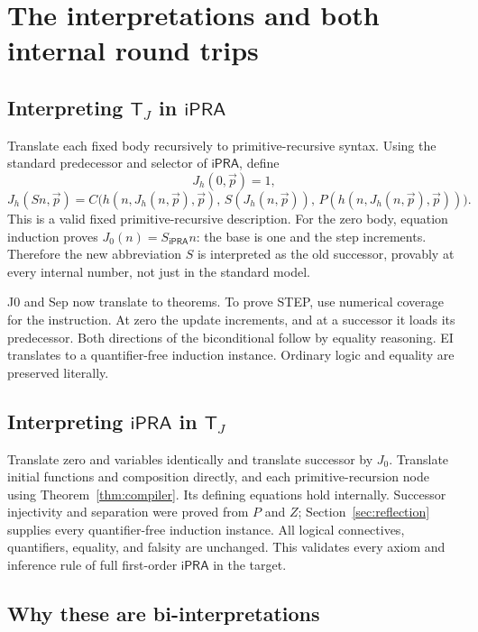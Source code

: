 \documentclass[11pt,letterpaper]{article}
\theoremstyle{definition}\newtheorem{definition}[theorem]{Definition}
\theoremstyle{remark}\newtheorem{remark}[theorem]{Remark}
\newcommand{\ipra}{\mathsf{iPRA}}
\newcommand{\TJ}{\mathsf T_J}
\begin{document}
\section{The interpretations and both internal round trips}\label{sec:interpretations}

\subsection{Interpreting \texorpdfstring{$\TJ$}{T-J} in \texorpdfstring{$\ipra$}{iPRA}}

Translate each fixed body recursively to primitive-recursive syntax.
Using the standard predecessor and selector of $\ipra$, define
\[
 J_h(0,\vec p)=1,
\]
\[
 J_h(Sn,\vec p)=
 C\bigl(h(n,J_h(n,\vec p),\vec p),\,
       S(J_h(n,\vec p)),\,
       P(h(n,J_h(n,\vec p),\vec p))\bigr).
 \tag{J in iPRA}
\]
This is a valid fixed primitive-recursive description. For the zero
body, equation induction proves $J_0(n)=S_{\ipra}n$: the base
is one and the step increments. Therefore the new abbreviation $S$
is interpreted as the old successor, provably at every internal
number, not just in the standard model.

J0 and Sep now translate to theorems. To prove STEP, use numerical
coverage for the instruction. At zero the update increments, and at
a successor it loads its predecessor. Both directions of the
biconditional follow by equality reasoning. EI translates to a
quantifier-free induction instance. Ordinary logic and equality
are preserved literally.

\subsection{Interpreting \texorpdfstring{$\ipra$}{iPRA} in \texorpdfstring{$\TJ$}{T-J}}

Translate zero and variables identically and translate successor by
$J_0$. Translate initial functions and composition directly, and
each primitive-recursion node using Theorem~\ref{thm:compiler}.
Its defining equations hold internally. Successor injectivity and
separation were proved from $P$ and $Z$; Section~\ref{sec:reflection}
supplies every quantifier-free induction instance. All logical
connectives, quantifiers, equality, and falsity are unchanged.
This validates every axiom and inference rule of full first-order
$\ipra$ in the target.

\subsection{Why these are bi-interpretations}
\end{document}
